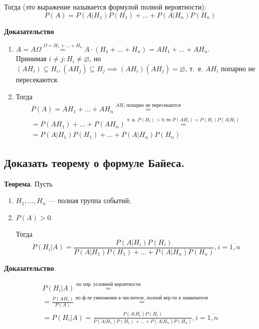 Тогда (это выражение называется формулой полной вероятности):
\begin{equation}
	P(A) = P(A|H_{1})P(H_{1}) + ... + P(A|H_{n})P(H_{n})
\end{equation}

\textbf{Доказательство}
\begin{enumerate}
	\item $A = A \Omega \stackrel{\Omega=H_{1} + ... + H_{n}}{=} A \cdot (H_{1} + ... + H_{n}) = AH_{1} + ... + AH_{n}$. \\
	Принимая $i \neq j: H_{i} \neq \varnothing$, но $(AH_{i}) \subseteq H_{i}, (AH_{j}) \subseteq H_{j} \implies (AH_{i})(AH_{j}) = \varnothing$, т.~е. $AH_{i}$ попарно не пересекаются.
	\item Тогда
	\begin{gather*}
		P(A) = AH_{1} + ... + AH_{n} \stackrel{AH_{i} \text{ попарно не пересекаются}}{=} \\
		= P(AH_{1}) + ... + P(AH_{n}) \stackrel{\text{т.~к. } P(H_{i}) > 0, \text{то } P(AH_{i}) = P(H_{i})P(A|H_{i})}{=}\\
		= P(A|H_{1})P(H_{1}) + ... + P(A|H_{n})P(H_{n})
	\end{gather*}
\end{enumerate}

\subsection{Доказать теорему о формуле Байеса.}

\textbf{Теорема}. Пусть
\begin{enumerate}
	\item $H_{1}, ..., H_{n}$ --- полная группа событий;
	\item $P(A) > 0$.
	
	Тогда
	\begin{equation}
		P(H_{i}|A) = \frac{P(A|H_{i})P(H_{i})}{P(A|H_{1})P(H_{1}) + ... + P(A|H_{n})P(H_{n})}, i = \overline{1, n}
	\end{equation}
\end{enumerate}

\textbf{Доказательство}. 

\begin{gather*}
	P(H_{i}|A) \stackrel{\text{по опр. условной вероятности}}{=} \\
	= \frac{P(AH_{i})}{P(A)} \stackrel{\text{по ф-ле умножения в числителе, полной вер-ти в знаменателе}}{=} \\
	= P(H_{i}|A) = \frac{P(A|H_{i})P(H_{i})}{P(A|H_{1})P(H_{1}) + ... + P(A|H_{n})P(H_{n})}, i = \overline{1, n}
\end{gather*}

